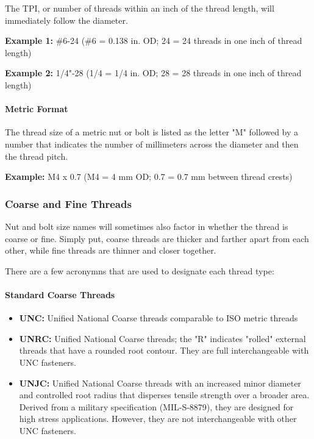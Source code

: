 \documentclass[12pt, a4paper]{article}
\providecommand{\tightlist}{%
	\setlength{\itemsep}{0pt}\setlength{\parskip}{0pt}}
\providecommand{\tightlist}{%
	\setlength{\itemsep}{0pt}\setlength{\parskip}{0pt}}
\let\oldparagraph\paragraph
\renewcommand{\paragraph}[1]{\oldparagraph{#1}\mbox{}}
\begin{document}
		\hypertarget{ii5xkl}{}
		The TPI, or number of threads within an inch of the thread length, will
		immediately follow the diameter.
		
		\hypertarget{iujivc}{}
		\textbf{Example 1:} \#6-24 (\#6 = 0.138 in. OD; 24 = 24 threads in one
		inch of thread length)
		
		\textbf{Example 2:} 1/4"-28 (1/4 = 1/4 in. OD; 28 = 28 threads in one
		inch of thread length)
		
		\hypertarget{i7byi7f}{%
			\paragraph{Metric Format}\label{i7byi7f}}
		
		\hypertarget{ibz5no}{}
		The thread size of a metric nut or bolt is listed as the letter "M"
		followed by a number that indicates the number of millimeters across the
		diameter and then the thread pitch.
		
		\hypertarget{ivmq62}{}
		\textbf{Example:} M4 x 0.7 (M4 = 4 mm OD; 0.7 = 0.7 mm between thread
		crests)
		
		\hypertarget{ia6doav}{%
			\subsubsection{Coarse and Fine Threads}\label{ia6doav}}
		
		\hypertarget{i5h0xk}{}
		Nut and bolt size names will sometimes also factor in whether the thread
		is coarse or fine. Simply put, coarse threads are thicker and farther
		apart from each other, while fine threads are thinner and closer
		together.
		
		\hypertarget{i56kg7}{}
		There are a few acronymns that are used to designate each thread type:
		
		\hypertarget{im72dg}{%
			\paragraph{Standard Coarse Threads}\label{im72dg}}
		
		\begin{itemize}
			\tightlist
			\item
			\textbf{UNC:} Unified National Coarse threads comparable to ISO metric
			threads
			\item
			\textbf{UNRC:} Unified National Coarse threads; the "R" indicates
			"rolled" external threads that have a rounded root contour. They are
			full interchangeable with UNC fasteners.
			\item
			\textbf{UNJC:} Unified National Coarse threads with an increased minor
			diameter and controlled root radius that disperses tensile strength
			over a broader area. Derived from a military specification
			(MIL-S-8879), they are designed for high stress applications. However,
			they are not interchangeable with other UNC fasteners.
		\end{itemize}
		
\end{document}
